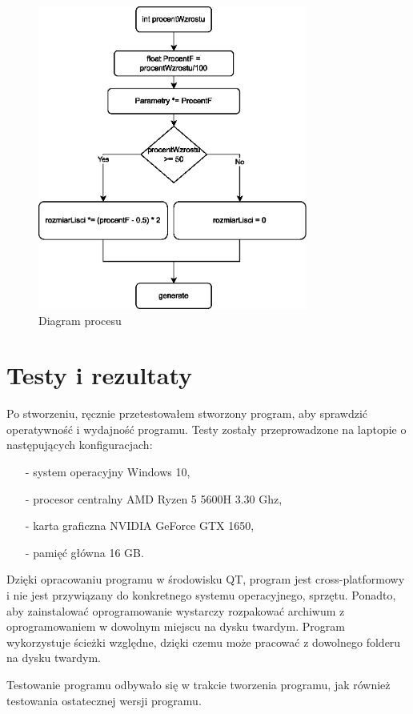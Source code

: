 \documentclass[a4paper,twoside,12pt]{report}
\begin{document}
\begin{figure}[H]
	\centering\includegraphics[height=10cm]{grafika/diagrams/flow}
	\caption{Diagram procesu}
    \label{fig:flowDiagram}
\end{figure}

\chapter{Testy i rezultaty}

Po stworzeniu, ręcznie przetestowałem stworzony program, 
aby sprawdzić operatywność i wydajność programu. 
Testy zostały przeprowadzone na laptopie o 
następujących konfiguracjach:
\begin{itemize}
	\item[-] system operacyjny Windows 10,
	\item[-] procesor centralny AMD Ryzen 5 5600H 3.30 Ghz,
	\item[-] karta graficzna NVIDIA GeForce GTX 1650,
	\item[-] pamięć główna 16 GB. 
\end{itemize}

Dzięki opracowaniu programu w środowisku QT, 
program jest cross-platformowy i nie jest przywiązany 
do konkretnego systemu operacyjnego, sprzętu. 
Ponadto, aby zainstalować oprogramowanie wystarczy 
rozpakować archiwum z oprogramowaniem w dowolnym miejscu 
na dysku twardym. Program wykorzystuje ścieżki względne, 
dzięki czemu może pracować z dowolnego folderu 
na dysku twardym. 

Testowanie programu odbywało się w trakcie tworzenia programu, 
jak również testowania ostatecznej wersji programu. 
\end{document}
